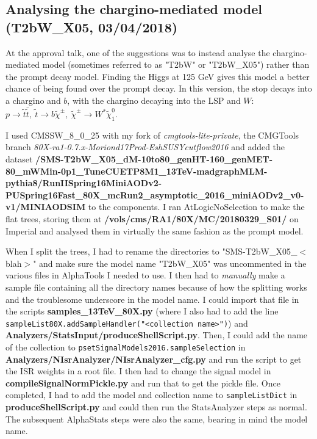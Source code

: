 \subsection{Analysing the chargino-mediated model (T2bW\_X05, 03/04/2018)}

At the approval talk, one of the suggestions was to instead analyse the chargino-mediated model (sometimes referred to as "T2bW" or "T2bW\_X05") rather than the prompt decay model. Finding the Higgs at 125 GeV gives this model a better chance of being found over the prompt decay. In this version, the stop decays into a chargino and $b$, with the chargino decaying into the LSP and $W$: $p \rightarrow \tilde{t} \bar{\tilde{t}}, \ \tilde{t} \rightarrow b\tilde{\chi}^{\pm}, \ \tilde{\chi}^{\pm} \rightarrow W^* \tilde{\chi}_1^0$.

I used CMSSW\_8\_0\_25 with my fork of \emph{cmgtools-lite-private}, the CMGTools branch \emph{80X-ra1-0.7.x-Moriond17Prod-EshSUSYcutflow2016} and added the dataset \textbf{/SMS-T2bW\_X05\_dM-10to80\_genHT-160\_genMET-80\_mWMin-0p1\_TuneCUETP8M1\_13TeV-madgraphMLM-pythia8/RunIISpring16MiniAODv2-PUSpring16Fast\_80X\_mcRun2\_asymptotic\_2016\_miniAODv2\_v0-v1/MINIAODSIM} to the components. I ran AtLogicNoSelection to make the flat trees, storing them at \textbf{/vols/cms/RA1/80X/MC/20180329\_S01/} on Imperial and analysed them in virtually the same fashion as the prompt model.

When I split the trees, I had to rename the directories to "SMS-T2bW\_X05\_$<$blah$>$" and make sure the model name "T2bW\_X05" was uncommented in the various files in AlphaTools I needed to use. I then had to \emph{manually} make a sample file containing all the directory names because of how the splitting works and the troublesome underscore in the model name. I could import that file in the scripts \textbf{samples\_13TeV\_80X.py} (where I also had to add the line \texttt{sampleList80X.addSampleHandler("<collection name>")}) and \textbf{Analyzers/StatsInput/produceShellScript.py}. Then, I could add the name of the collection to \texttt{psetSignalModels2016.sampleSelection} in \textbf{Analyzers/NIsrAnalyzer/NIsrAnalyzer\_cfg.py} and run the script to get the ISR weights in a root file. I then had to change the signal model in \textbf{compileSignalNormPickle.py} and run that to get the pickle file. Once completed, I had to add the model and collection name to \texttt{sampleListDict} in \textbf{produceShellScript.py} and could then run the StatsAnalyzer steps as normal. The subsequent AlphaStats steps were also the same, bearing in mind the model name.

